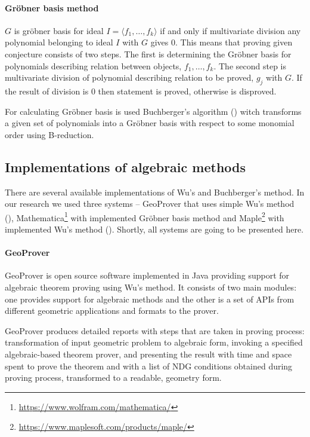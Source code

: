 \documentclass[final,1p,times,authoryear]{elsarticle}
\begin{document}
\paragraph{Gr\"obner basis method}

$G$ is gr\"obner basis for ideal $I = \langle f_1, \ldots, f_k
\rangle$ if and only if multivariate division any polynomial belonging
to ideal $I$ with $G$ gives $0$. This means that proving given
conjecture consists of two steps. The first is determining the
Gr\"obner basis for polynomials describing relation between objects,
$f_1, \ldots, f_k$. The second step is multivariate division of
polynomial describing relation to be proved, $g_j$ with $G$. If the
result of division is $0$ then statement is proved, otherwise is
disproved.

For calculating Gr\"obner basis is used Buchberger's algorithm
(\cite{buchberger}) witch transforms a given set of polynomials into a
Gr\"obner basis with respect to some monomial order using B-reduction.

\subsection{Implementations of algebraic methods}

There are several available implementations of Wu's and Buchberger's
method. In our research we used three systems -- GeoProver that uses
simple Wu's method (\cite{geoprover}),
Mathematica\footnote{\url{https://www.wolfram.com/mathematica/}} with
implemented Gr\"obner basis method and
Maple\footnote{\url{https://www.maplesoft.com/products/maple/}} with
implemented Wu's method (\cite{wsolve}). Shortly, all systems are
going to be presented here.

\paragraph{GeoProver}

GeoProver is open source software implemented in Java providing
support for algebraic theorem proving using Wu's method. It consists
of two main modules: one provides support for algebraic methods and
the other is a set of APIs from different geometric applications and
formats to the prover.

GeoProver produces detailed reports with steps that are taken in
proving process: transformation of input geometric problem to
algebraic form, invoking a specified algebraic-based theorem prover,
and presenting the result with time and space spent to prove the
theorem and with a list of NDG conditions obtained during proving
process, transformed to a readable, geometry form.
\end{document}
